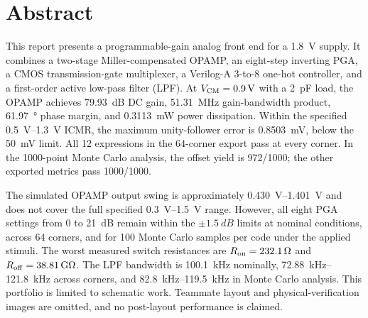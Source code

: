 \chapter*{Abstract}

This report presents a programmable-gain analog front end for a \SI{1.8}{V} supply. It combines a two-stage Miller-compensated OPAMP, an eight-step inverting PGA, a CMOS transmission-gate multiplexer, a Verilog-A 3-to-8 one-hot controller, and a first-order active low-pass filter (LPF). At \(V_{\mathrm{CM}}=\SI{0.9}{V}\) with a \SI{2}{pF} load, the OPAMP achieves \SI{79.93}{dB} DC gain, \SI{51.31}{MHz} gain-bandwidth product, \SI{61.97}{\degree} phase margin, and \SI{0.3113}{mW} power dissipation. Within the specified \SIrange{0.5}{1.3}{V} ICMR, the maximum unity-follower error is \SI{0.8503}{mV}, below the \SI{50}{mV} limit. All 12 expressions in the 64-corner export pass at every corner. In the 1000-point Monte Carlo analysis, the offset yield is 972/1000; the other exported metrics pass 1000/1000.

The simulated OPAMP output swing is approximately \SIrange{0.430}{1.401}{V} and does not cover the full specified \SIrange{0.3}{1.5}{V} range. However, all eight PGA settings from 0 to \SI{21}{dB} remain within the \(\pm\SI{1.5}{dB}\) limits at nominal conditions, across 64 corners, and for 100 Monte Carlo samples per code under the applied stimuli. The worst measured switch resistances are \(R_{\mathrm{on}}=\SI{232.1}{\ohm}\) and \(R_{\mathrm{off}}=\SI{38.81}{\giga\ohm}\). The LPF bandwidth is \SI{100.1}{kHz} nominally, \SIrange{72.88}{121.8}{kHz} across corners, and \SIrange{82.8}{119.5}{kHz} in Monte Carlo analysis. This portfolio is limited to schematic work. Teammate layout and physical-verification images are omitted, and no post-layout performance is claimed.
